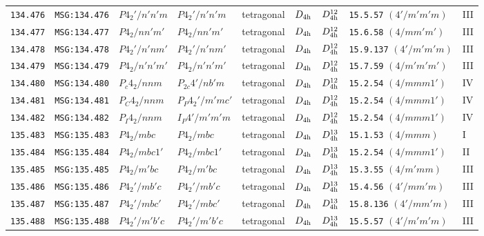 \documentclass[fleqn,10pt]{jsarticle}
\begin{document}
\begin{center}
\begin{longtable}{lllllllll}
\texttt{134.476} & \texttt{MSG:134.476} & $P4_{2}'/n'n'm$ & $P4_{2}'/n'n'm$ & tetragonal & $D_{\rm 4h}$ & $D_{\rm 4h}^{12}$ & \texttt{15.5.57} $(4'/m'm'm)$ & III \\
\texttt{134.477} & \texttt{MSG:134.477} & $P4_{2}/nn'm'$ & $P4_{2}/nn'm'$ & tetragonal & $D_{\rm 4h}$ & $D_{\rm 4h}^{12}$ & \texttt{15.6.58} $(4/mm'm')$ & III \\
\texttt{134.478} & \texttt{MSG:134.478} & $P4_{2}'/n'nm'$ & $P4_{2}'/n'nm'$ & tetragonal & $D_{\rm 4h}$ & $D_{\rm 4h}^{12}$ & \texttt{15.9.137} $(4'/m'm'm)$ & III \\
\texttt{134.479} & \texttt{MSG:134.479} & $P4_{2}/n'n'm'$ & $P4_{2}/n'n'm'$ & tetragonal & $D_{\rm 4h}$ & $D_{\rm 4h}^{12}$ & \texttt{15.7.59} $(4/m'm'm')$ & III \\
\texttt{134.480} & \texttt{MSG:134.480} & $P_{c}4_{2}/nnm$ & $P_{2c}4'/nb'm$ & tetragonal & $D_{\rm 4h}$ & $D_{\rm 4h}^{12}$ & \texttt{15.2.54} $(4/mmm1')$ & IV \\
\texttt{134.481} & \texttt{MSG:134.481} & $P_{C}4_{2}/nnm$ & $P_{P}4_{2}'/m'mc'$ & tetragonal & $D_{\rm 4h}$ & $D_{\rm 4h}^{12}$ & \texttt{15.2.54} $(4/mmm1')$ & IV \\
\texttt{134.482} & \texttt{MSG:134.482} & $P_{I}4_{2}/nnm$ & $I_{P}4'/m'm'm$ & tetragonal & $D_{\rm 4h}$ & $D_{\rm 4h}^{12}$ & \texttt{15.2.54} $(4/mmm1')$ & IV \\ \hline
\texttt{135.483} & \texttt{MSG:135.483} & $P4_{2}/mbc$ & $P4_{2}/mbc$ & tetragonal & $D_{\rm 4h}$ & $D_{\rm 4h}^{13}$ & \texttt{15.1.53} $(4/mmm)$ & I \\
\texttt{135.484} & \texttt{MSG:135.484} & $P4_{2}/mbc1'$ & $P4_{2}/mbc1'$ & tetragonal & $D_{\rm 4h}$ & $D_{\rm 4h}^{13}$ & \texttt{15.2.54} $(4/mmm1')$ & II \\
\texttt{135.485} & \texttt{MSG:135.485} & $P4_{2}/m'bc$ & $P4_{2}/m'bc$ & tetragonal & $D_{\rm 4h}$ & $D_{\rm 4h}^{13}$ & \texttt{15.3.55} $(4/m'mm)$ & III \\
\texttt{135.486} & \texttt{MSG:135.486} & $P4_{2}'/mb'c$ & $P4_{2}'/mb'c$ & tetragonal & $D_{\rm 4h}$ & $D_{\rm 4h}^{13}$ & \texttt{15.4.56} $(4'/mm'm)$ & III \\
\texttt{135.487} & \texttt{MSG:135.487} & $P4_{2}'/mbc'$ & $P4_{2}'/mbc'$ & tetragonal & $D_{\rm 4h}$ & $D_{\rm 4h}^{13}$ & \texttt{15.8.136} $(4'/mm'm)$ & III \\
\texttt{135.488} & \texttt{MSG:135.488} & $P4_{2}'/m'b'c$ & $P4_{2}'/m'b'c$ & tetragonal & $D_{\rm 4h}$ & $D_{\rm 4h}^{13}$ & \texttt{15.5.57} $(4'/m'm'm)$ & III \\

\end{longtable}
\end{center}
\end{document}
